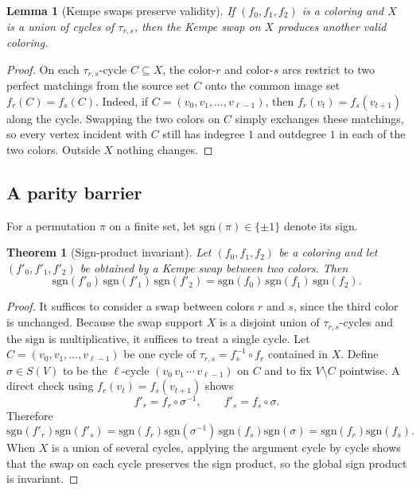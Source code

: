 \documentclass[11pt]{article}
\newtheorem{theorem}{Theorem}
\newtheorem{lemma}{Lemma}
\begin{document}
\begin{lemma}[Kempe swaps preserve validity]\label{lem:kempe-valid}
If $(f_0,f_1,f_2)$ is a coloring and $X$ is a union of cycles of $\tau_{r,s}$, then the Kempe swap on $X$ produces another valid coloring.
\end{lemma}

\begin{proof}
On each $\tau_{r,s}$-cycle $C\subseteq X$, the color-$r$ and color-$s$ arcs restrict to two perfect matchings from the source set $C$ onto the common image set $f_r(C)=f_s(C)$.
Indeed, if $C=(v_0,v_1,\dots,v_{\ell-1})$, then $f_r(v_t)=f_s(v_{t+1})$ along the cycle.
Swapping the two colors on $C$ simply exchanges these matchings, so every vertex incident with $C$ still has indegree $1$ and outdegree $1$ in each of the two colors.
Outside $X$ nothing changes.
\end{proof}

\subsection{A parity barrier}
For a permutation $\pi$ on a finite set, let $\mathrm{sgn}(\pi)\in\{\pm1\}$ denote its sign.

\begin{theorem}[Sign-product invariant]\label{thm:sign-invariant}
Let $(f_0,f_1,f_2)$ be a coloring and let $(f'_0,f'_1,f'_2)$ be obtained by a Kempe swap between two colors.
Then
\[
\mathrm{sgn}(f'_0)\,\mathrm{sgn}(f'_1)\,\mathrm{sgn}(f'_2)
=
\mathrm{sgn}(f_0)\,\mathrm{sgn}(f_1)\,\mathrm{sgn}(f_2).
\]
\end{theorem}

\begin{proof}
It suffices to consider a swap between colors $r$ and $s$, since the third color is unchanged.
Because the swap support $X$ is a disjoint union of $\tau_{r,s}$-cycles and the sign is multiplicative, it suffices to treat a single cycle.
Let $C=(v_0,v_1,\dots,v_{\ell-1})$ be one cycle of $\tau_{r,s}=f_s^{-1}\circ f_r$ contained in $X$.
Define $\sigma\in S(V)$ to be the $\ell$-cycle $(v_0\,v_1\,\cdots\,v_{\ell-1})$ on $C$ and to fix $V\setminus C$ pointwise.
A direct check using $f_r(v_t)=f_s(v_{t+1})$ shows
\[
f'_r=f_r\circ\sigma^{-1},\qquad f'_s=f_s\circ\sigma.
\]
Therefore
\[
\mathrm{sgn}(f'_r)\mathrm{sgn}(f'_s)
=
\mathrm{sgn}(f_r)\mathrm{sgn}(\sigma^{-1})\,\mathrm{sgn}(f_s)\mathrm{sgn}(\sigma)
=
\mathrm{sgn}(f_r)\mathrm{sgn}(f_s).
\]
When $X$ is a union of several cycles, applying the argument cycle by cycle shows that the swap on each cycle preserves the sign product, so the global sign product is invariant.
\end{proof}
\end{document}
